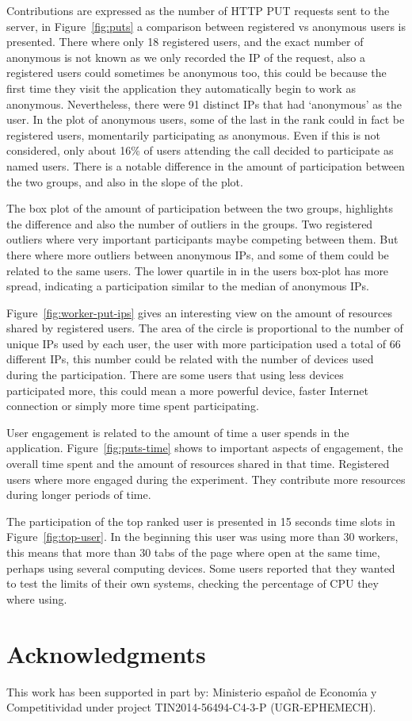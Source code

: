 \documentclass{llncs}
\begin{document}
Contributions are expressed as the number of HTTP PUT requests sent to the server, 
in Figure~\ref{fig:puts} a comparison between registered vs anonymous users is 
presented. There where only 18 registered users, and the exact number of anonymous
is not known as we only recorded the IP of the request, also a registered users 
could sometimes be anonymous too, this could be because the first time they visit
the application they automatically begin to work as anonymous. Nevertheless,
there were 91 distinct IPs that had `anonymous' as the user. In the plot of
anonymous users, some of the last in the rank could in fact be registered users, 
momentarily participating as anonymous. Even if this is not considered, only 
about 16\% of users attending the call decided to participate as named users. 
There is a notable difference in the amount of participation between the two
groups, and also in the slope of the plot.

The box plot of the amount of participation between the two groups, highlights
the difference and also the number of outliers in the groups. Two registered 
outliers where very important participants maybe competing between them. But
there where more outliers between anonymous IPs, and some of them could be related
to the same users. The lower quartile in in the users box-plot has more
spread, indicating a participation similar to the median of anonymous IPs.

Figure~\ref{fig:worker-put-ips} gives an interesting view on the amount of
resources shared by registered users. The area of the circle is proportional
to the number of unique IPs used by each user, the user with more participation
used a total of 66 different IPs, this number could be related with the number
of devices used during the participation. There are some users that using less
devices participated more, this could mean a more powerful device, faster 
Internet connection or simply more time spent participating.

User engagement is related to the amount of time a user spends in the 
application. Figure~\ref{fig:puts-time} shows to important aspects of
engagement, the overall time spent and the amount of resources shared
in that time. Registered users where more engaged during the experiment.
They contribute more resources during longer periods of time.

The participation of the top ranked user is presented in 15 seconds time slots in
Figure~\ref{fig:top-user}. In the beginning this user was using more than 30
workers, this means that more than 30 tabs of the page where open at the
same time, perhaps using several computing devices. Some users reported that 
they wanted to test the limits of their own systems, checking the percentage of
CPU they where using. 


\section*{Acknowledgments}

This work has been supported in part by: Ministerio espa\~{n}ol de
Econom\'{\i}a y Competitividad under project TIN2014-56494-C4-3-P
(UGR-EPHEMECH).




\end{document}
